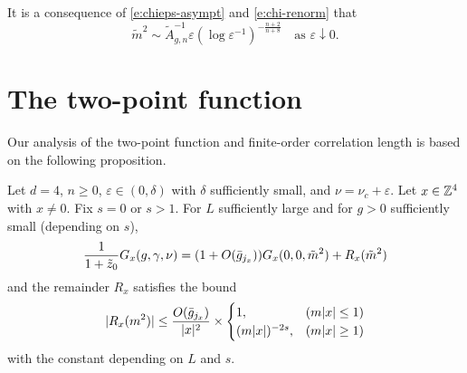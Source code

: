 \begin{rk}
It is a consequence of \eqref{e:chieps-asympt} and \eqref{e:chi-renorm} that
\begin{equation}
\label{e:mass-epsilon-asympt}
\tilde m^2
	\sim
\tilde A_{g,n}^{-1} \varepsilon (\log \varepsilon^{-1})^{-\frac{n + 2}{n + 8}}
	\quad
\text{as $\varepsilon \downarrow 0$}.
\end{equation}
\end{rk}


\section{The two-point function}

Our analysis of the two-point function and finite-order correlation length is
based on the following proposition.

\begin{prop}
\label{prop:R}
Let $d=4$, $n \ge 0$, $\varepsilon \in (0,\delta)$ with $\delta$ sufficiently small,
and $\nu = \nu_c + \varepsilon$.
Let $x \in {\mathbb Z}^4$ with $x \neq 0$.
Fix $s = 0$ or $s > 1$.
For $L$ sufficiently large and for $g > 0$ sufficiently small (depending on $s$),
\begin{equation}
\label{e:Gab-to-sum-Rqj}
\frac{1}{1+\tilde z_0} G_x(g, \gamma, \nu)
	=
(1 + O(\bar{g}_{j_x})) G_x(0, 0, \tilde m^2) + R_x(\tilde m^2)
\end{equation}
and the remainder $R_x$ satisfies the bound
\begin{equation}
\label{e:Rab-bound}
|R_{x}(m^2)|
	\le
\frac{O(\bar{g}_{j_{x}}) }{|x|^2}
	\times
\begin{cases}
1,				& (m|x|\le 1) \\
(m|x|)^{-2s},	& (m|x|\ge 1)
\end{cases}
\end{equation}
with the  constant depending on $L$ and $s$.
\end{prop}

